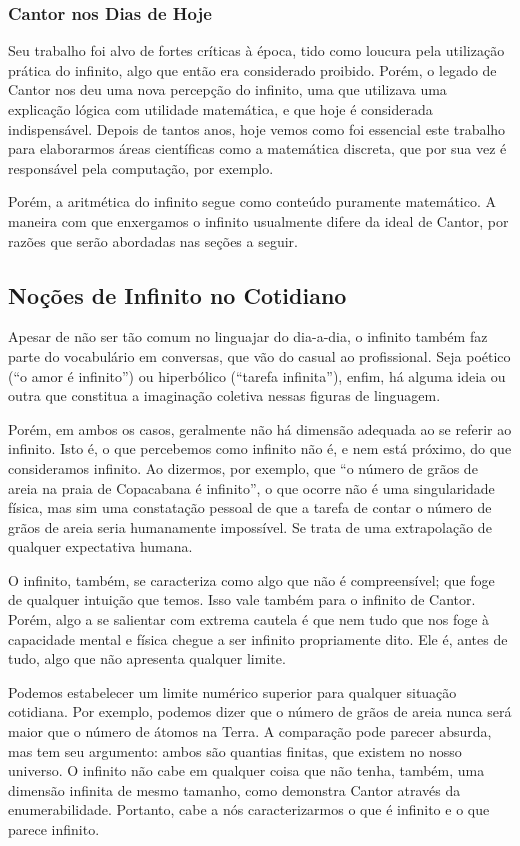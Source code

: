 \documentclass[journal,transmag]{IEEEtran}
\begin{document}
\subsubsection{Cantor nos Dias de Hoje}

Seu trabalho foi alvo de fortes críticas à época, tido como loucura
pela utilização prática do infinito, algo que então era considerado proibido.
Porém, o legado de Cantor nos deu uma nova percepção do infinito, uma que
utilizava uma explicação lógica com utilidade matemática, e que hoje é considerada
indispensável. Depois de tantos anos, hoje vemos como foi essencial este trabalho
para elaborarmos áreas científicas como a matemática discreta, que por sua vez
é responsável pela computação, por exemplo.

Porém, a aritmética do infinito segue como conteúdo puramente matemático.
A maneira com que enxergamos o infinito usualmente difere da ideal de Cantor,
por razões que serão abordadas nas seções a seguir.


\subsection{Noções de Infinito no Cotidiano}
Apesar de não ser tão comum no linguajar do dia-a-dia, o infinito também faz
parte do vocabulário em conversas, que vão do casual ao profissional.
Seja poético (``o amor é infinito'') ou hiperbólico (``tarefa infinita''), enfim,
há alguma ideia ou outra que constitua a imaginação coletiva nessas figuras de
linguagem.

Porém, em ambos os casos, geralmente não há dimensão adequada ao se referir ao
infinito. Isto é, o que percebemos como infinito não é, e nem está próximo, do
que consideramos infinito. Ao dizermos, por exemplo, que ``o número de grãos de areia na praia de
Copacabana é infinito'', o que ocorre não é uma singularidade física, mas sim
uma constatação pessoal de que a tarefa de contar o número de grãos de areia
seria humanamente impossível. Se trata de uma extrapolação de qualquer expectativa
humana.

O infinito, também, se caracteriza como algo que não é compreensível;
que foge de qualquer intuição que temos. Isso vale também para o infinito de Cantor.
Porém, algo a se salientar com extrema cautela é que nem tudo que nos foge à
capacidade mental e física chegue a ser infinito propriamente dito.
Ele é, antes de tudo, algo que não apresenta qualquer limite.

Podemos estabelecer um limite numérico superior para qualquer situação cotidiana.
Por exemplo, podemos dizer que o número de grãos de areia nunca será maior que o
número de átomos na Terra. A comparação pode parecer absurda, mas tem seu argumento:
ambos são quantias finitas, que existem no nosso universo. O infinito não cabe
em qualquer coisa que não tenha, também, uma dimensão infinita de mesmo tamanho,
como demonstra Cantor através da enumerabilidade. Portanto, cabe a nós
caracterizarmos o que é infinito e o que parece infinito.
\end{document}
